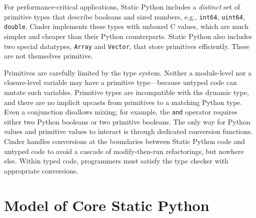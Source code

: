 \documentclass[english,cleveref,submission]{programming}
\newcommand{\SP}{Static Python}
\newcommand{\code}[1]{\texttt{#1}}
\begin{document}
For performance-critical applications, \SP{} includes a \emph{distinct} set of primitive types
that describe booleans and sized numbers, e.g., \code{int64}, \code{uint64}, \code{double}.
Cinder implements these types with unboxed C values, which are much simpler and cheaper
than their Python counterparts.
\SP{} also includes two special datatypes, \code{Array} and \code{Vector}, that store primitives efficiently.
These are not themselves primitive.

Primitives are carefully limited by the type system.
Neither a module-level nor a closure-level variable may have a primitive
type---because untyped code can mutate such variables.
Primitive types are incompatible with the dynamic type,
and there are no implicit upcasts from primitives
to a matching Python type.
Even a conjunction disallows mixing; for example, the \code{and} operator
requires either two Python booleans or two primitive booleans.
The only way for Python values and primitive values to interact
is through dedicated conversion functions.
Cinder handles conversions at the boundaries between \SP{} code
and untyped code to avoid a cascade of modify-then-run refactorings, but nowhere else.
Within typed code, programmers must satisfy the type checker with
appropriate conversions.





\section{Model of Core \SP{}}
\label{s:model}



\end{document}
